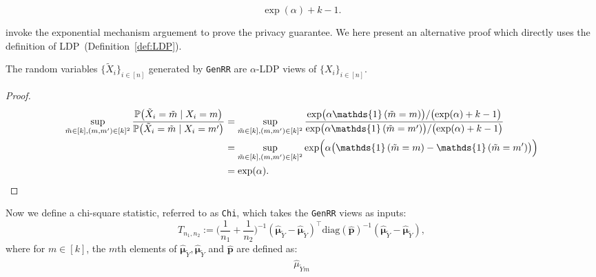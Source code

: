 \documentclass[twoside,11pt]{article}
\newcommand{\indicator}[1]{\mathds{1}\left( #1 \right) }%
\newcommand{\rvTwo}{Y}
\newcommand{\rvX}{X} %
\newcommand{\rvXPriv}{\tilde{\rvX}} %
\newcommand{\rvY}{Y}
\newcommand{\mP}{\mathbb{P}} %
\newcommand{\alphabetSize}{k} %
\newcommand{\vectorIndex}{m}
\newcommand{\sampleSize}{n}
\newcommand{\probVec}{\mathbf{p}} %
\newcommand{\privacyParameter}{\alpha} %
\begin{document}
\begin{appendix}
\begin{itemize}
\begin{definition}
\begin{equation}
			{\exp(\alpha) + \alphabetSize - 1 }.
		\end{equation}
	\end{definition}
	\noindent
	\citet{Gaboardi2018LDPChisq} invoke the exponential mechanism arguement to prove the privacy guarantee. We here present an alternative proof which directly uses the definition of LDP~(Definition~\ref{def:LDP}).
	\begin{lemma}
		The random variables $\{\rvXPriv_{i}\}_{i \in [n]}$ generated by \textnormal{\texttt{GenRR}}  are $\privacyParameter$-LDP views of $\{X_i\}_{i \in [n]}$.
	\end{lemma}
	\begin{proof}
		\begin{align*}
			\sup_{\tilde{m} \in [k], (m, m')\in [k]^2}
			\frac{\mP
				\bigl(
				\tilde{\rvX}_{i} = \tilde{m}
				\;|\;
				\rvX_i = m
				\bigr)
			}{
				\mP
				\bigl(
				\tilde{\rvX}_{i} = \tilde{m}
				\;|\;
				\rvX_i = m'
				\bigr)
			}
			&=
			\sup_{\tilde{m} \in [k], (m, m')\in [k]^2}
			\frac{
				\exp \bigl( \alpha \indicator{	\tilde{m} = m} \bigr)
				/
				\bigl(  \exp(\alpha) + \alphabetSize - 1 \bigr) 
			}{
				\exp \bigl( \alpha \indicator{	\tilde{m} = m'} \bigr)
				/
				\bigl(  \exp(\alpha) + \alphabetSize - 1 \bigr)
			}
			\\&=
			\sup_{\tilde{m} \in [k], (m, m')\in [k]^2}
			\exp \Bigl( \alpha 
			\bigl(
			\indicator{	\tilde{m} = m}
			-
			\indicator{	\tilde{m} = m'}
			\bigr)
			\Bigr)
			\\&= 
			\exp(\privacyParameter).
		\end{align*}
	\end{proof}
	Now we define a chi-square statistic, referred to as \texttt{Chi}, 
	which takes the \texttt{GenRR} views  as inputs:
	\begin{equation}\label{def:chi_statistic}
		T_{\sampleSize_1, \sampleSize_2}
		:=
		\biggl( \dfrac{1}{\sampleSize_1}+\dfrac{1}{\sampleSize_2} \biggr)^{-1}
		(
		\hat{\boldsymbol{\mu}}_{\tilde{\rvY}}
		-
		\hat{\boldsymbol{\mu}}_{\tilde{\rvY}}
		)^\top
		\mathrm{diag}(
		\hat{\probVec}
		)^{-1}
		(
		\hat{\boldsymbol{\mu}}_{\tilde{\rvY}}
		-
		\hat{\boldsymbol{\mu}}_{\tilde{\rvY}}
		),
	\end{equation}
	where for $\vectorIndex \in  [\alphabetSize]$,
	the $\vectorIndex$th elements of $\hat{\boldsymbol{\mu}}_{\tilde{\rvY}}, \hat{\boldsymbol{\mu}}_{\tilde{\rvY}}$ and $\hat{\probVec}$ are defined as:
	\begin{align*}
		\hat{\mu}_{\tilde{\rvTwo} \vectorIndex}

\end{align*}
\end{itemize}
\end{appendix}
\end{document}
